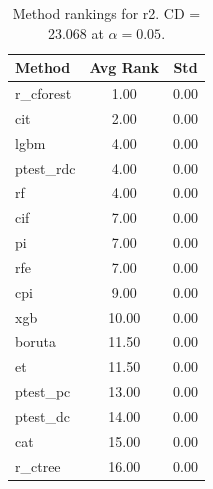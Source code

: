 \begin{table}[h]
\centering
\caption{Method rankings for r2. CD = 23.068 at $\alpha=0.05$.}
\label{tab:ranks_r2}
\begin{tabular}{lcc}
\toprule
Method & Avg Rank & Std \\
\midrule
r_cforest & 1.00 & 0.00 \\
cit & 2.00 & 0.00 \\
lgbm & 4.00 & 0.00 \\
ptest_rdc & 4.00 & 0.00 \\
rf & 4.00 & 0.00 \\
cif & 7.00 & 0.00 \\
pi & 7.00 & 0.00 \\
rfe & 7.00 & 0.00 \\
cpi & 9.00 & 0.00 \\
xgb & 10.00 & 0.00 \\
boruta & 11.50 & 0.00 \\
et & 11.50 & 0.00 \\
ptest_pc & 13.00 & 0.00 \\
ptest_dc & 14.00 & 0.00 \\
cat & 15.00 & 0.00 \\
r_ctree & 16.00 & 0.00 \\
\bottomrule
\end{tabular}
\end{table}